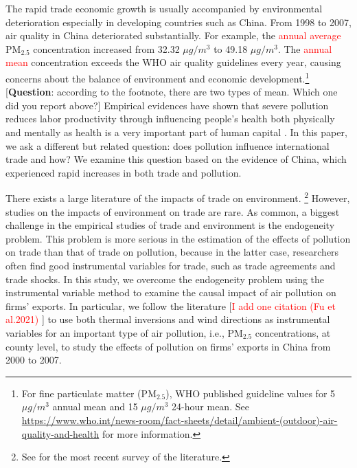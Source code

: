\documentclass[12pt]{article}
\begin{document}
    \label{sec:1} The rapid trade economic growth is usually accompanied by
environmental deterioration especially in developing countries such as
China. From 1998 to 2007, air quality in China deteriorated substantially.
For example, the \textcolor{red}{annual average} $\mathrm{PM_{2.5}}$ concentration increased from
32.32 $\mu g/m^{3}$ to 49.18 $\mu g/m^{3}$. The \textcolor{red}{annual mean} concentration exceeds
the WHO air quality guidelines every year, causing concerns about the
balance of environment and economic development.\footnote{%
For fine particulate matter ($\mathrm{PM_{2.5}}$), WHO published guideline
values for 5 $\mu g/m^{3}$ annual mean and 15 $\mu g/m^{3}$ 24-hour mean.
See %
\url{https://www.who.int/news-room/fact-sheets/detail/ambient-(outdoor)-air-quality-and-health}
for more information.} [\textbf{Question}: according to the footnote, there
are two types of mean. Which one did you report above?] Empirical evidences
have shown that severe pollution reduces labor productivity through
influencing people's health both physically and mentally as health is a very
important part of human capital %
\citep{graff2012impact,chang2016particulate,zhang2018impact,fu2021air,somanathan2021impact,adhvaryu2022management}%
. In this paper, we ask a different but related question: does pollution
influence international trade and how? We examine this question based on the
evidence of China, which experienced rapid increases in both trade and
pollution.

There exists a large literature of the impacts of trade on environment.%
\footnote{%
See \cite{cherniwchan2017trade} for the most recent survey of the literature.%
} However, studies on the impacts of environment on trade are rare. As
common, a biggest challenge in the empirical studies of trade and
environment is the endogeneity problem. This problem is more serious in the
estimation of the effects of pollution on trade than that of trade on
pollution, because in the latter case, researchers often find good
instrumental variables for trade, such as trade agreements and trade shocks.
In this study, we overcome the endogeneity problem using the instrumental
variable method to examine the causal impact of air pollution on firms'
exports. In particular, we follow the literature \citep{fu2021air, fu2021trans,NBERw28401,chen2022effect} [\textcolor{red}{I add one citation (Fu et al.2021)  }] to use both thermal inversions and
wind directions as instrumental variables for an important type of air
pollution, i.e., $\mathrm{PM_{2.5}}$ concentrations, at county level, to
study the effects of pollution on firms' exports in China from 2000 to 2007. 
\end{document}
